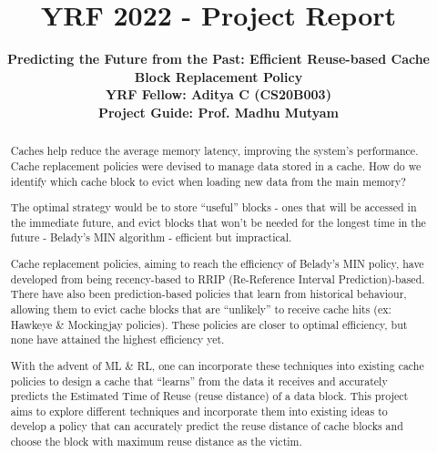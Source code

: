\documentclass[]{article}
\begin{document}
 \selectfont

\title{\Large \centering \textbf{ \selectfont YRF 2022 - Project Report}}

\author{\bf {} \selectfont Predicting the Future from the Past: Efficient Reuse-based Cache Block Replacement Policy
            \vspace{0.08in}\\ YRF Fellow: Aditya C (CS20B003)
            \vspace{0.07in}\\ Project Guide: Prof. Madhu Mutyam
}

\maketitle

\tableofcontents

\begin{abstract}

Caches help reduce the average memory latency, improving the system's performance. Cache replacement policies were devised to manage data stored in a cache. How do we identify which cache block to evict when loading new data from the main memory?

The optimal strategy would be to store “useful” blocks - ones that will be accessed in the immediate future, and evict blocks that won’t be needed for the longest time in the future - Belady’s MIN algorithm - efficient but impractical.

Cache replacement policies, aiming to reach the efficiency of Belady’s MIN policy, have developed from being recency-based to RRIP (Re-Reference Interval Prediction)-based. There have also been prediction-based policies that learn from historical behaviour, allowing them to evict cache blocks that are “unlikely” to receive cache hits (ex: Hawkeye \& Mockingjay policies). These policies are closer to optimal efficiency, but none have attained the highest efficiency yet.
    
With the advent of ML \& RL, one can incorporate these techniques into existing cache policies to design a cache that “learns” from the data it receives and accurately predicts the Estimated Time of Reuse (reuse distance) of a data block.  This project aims to explore different techniques and incorporate them into existing ideas to develop a policy that can accurately predict the reuse distance of cache blocks and choose the block with maximum reuse distance as the victim.
    

\end{abstract}
\end{document}
